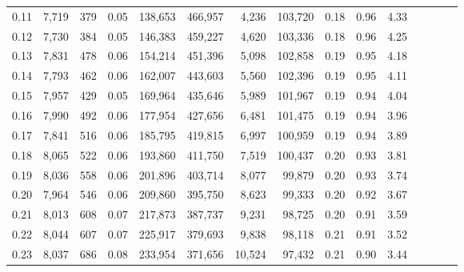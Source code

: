 \begin{tabular}{rrrcrrrrrrrrrrr}
0.11 &   7,719 &     379 &                                       0.05 &  138,653 &  466,957 &    4,236 &  103,720 &  0.18 &  0.96 &                         4.33 \\
0.12 &   7,730 &     384 &                                       0.05 &  146,383 &  459,227 &    4,620 &  103,336 &  0.18 &  0.96 &                         4.25 \\
0.13 &   7,831 &     478 &                                       0.06 &  154,214 &  451,396 &    5,098 &  102,858 &  0.19 &  0.95 &                         4.18 \\
0.14 &   7,793 &     462 &                                       0.06 &  162,007 &  443,603 &    5,560 &  102,396 &  0.19 &  0.95 &                         4.11 \\
0.15 &   7,957 &     429 &                                       0.05 &  169,964 &  435,646 &    5,989 &  101,967 &  0.19 &  0.94 &                         4.04 \\
0.16 &   7,990 &     492 &                                       0.06 &  177,954 &  427,656 &    6,481 &  101,475 &  0.19 &  0.94 &                         3.96 \\
0.17 &   7,841 &     516 &                                       0.06 &  185,795 &  419,815 &    6,997 &  100,959 &  0.19 &  0.94 &                         3.89 \\
0.18 &   8,065 &     522 &                                       0.06 &  193,860 &  411,750 &    7,519 &  100,437 &  0.20 &  0.93 &                         3.81 \\
0.19 &   8,036 &     558 &                                       0.06 &  201,896 &  403,714 &    8,077 &   99,879 &  0.20 &  0.93 &                         3.74 \\
0.20 &   7,964 &     546 &                                       0.06 &  209,860 &  395,750 &    8,623 &   99,333 &  0.20 &  0.92 &                         3.67 \\
0.21 &   8,013 &     608 &                                       0.07 &  217,873 &  387,737 &    9,231 &   98,725 &  0.20 &  0.91 &                         3.59 \\
0.22 &   8,044 &     607 &                                       0.07 &  225,917 &  379,693 &    9,838 &   98,118 &  0.21 &  0.91 &                         3.52 \\
0.23 &   8,037 &     686 &                                       0.08 &  233,954 &  371,656 &   10,524 &   97,432 &  0.21 &  0.90 &                         3.44 \\

\end{tabular}
